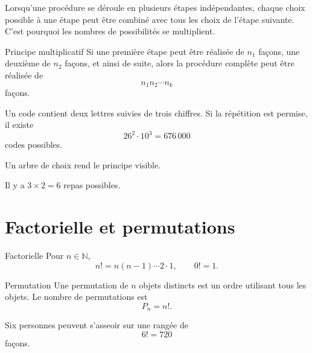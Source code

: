 \documentclass[12pt,a4paper,openany]{book}
\newcommand{\N}{\mathbb{N}}
\begin{document}
\begin{intuitionbox}
Lorsqu'une procédure se déroule en plusieurs étapes indépendantes, chaque choix possible à une étape peut être combiné avec tous les choix de l'étape suivante. C'est pourquoi les nombres de possibilités se multiplient.
\end{intuitionbox}

\begin{theorem}{Principe multiplicatif}{}
Si une première étape peut être réalisée de $n_1$ façons, une deuxième de $n_2$ façons, et ainsi de suite, alors la procédure complète peut être réalisée de
\[
n_1n_2\cdots n_k
\]
façons.
\end{theorem}

\begin{examplebox}
Un code contient deux lettres suivies de trois chiffres. Si la répétition est permise, il existe
\[
26^2\cdot10^3=676\,000
\]
codes possibles.
\end{examplebox}

Un arbre de choix rend le principe visible.

\begin{center}
\end{center}
Il y a $3\times2=6$ repas possibles.

\section{Factorielle et permutations}

\begin{definition}{Factorielle}{}
Pour $n\in\N$,
\[
n!=n(n-1)\cdots2\cdot1,
\qquad 0!=1.
\]
\end{definition}

\begin{definition}{Permutation}{}
Une permutation de $n$ objets distincts est un ordre utilisant tous les objets. Le nombre de permutations est
\[
P_n=n!.
\]
\end{definition}

\begin{examplebox}
Six personnes peuvent s'asseoir sur une rangée de
\[
6!=720
\]
façons.
\end{examplebox}
\end{document}
